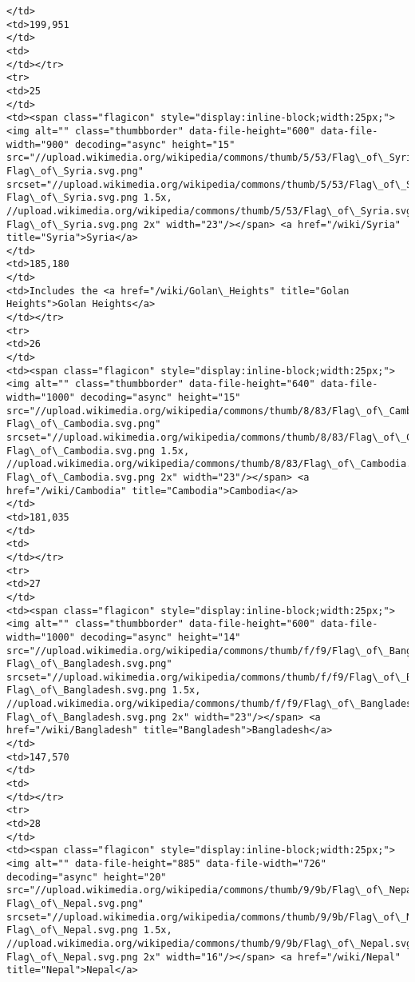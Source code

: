 \documentclass[11pt]{article}
\begin{document}
\begin{Verbatim}[commandchars=\\\{\}]
</td>
<td>199,951
</td>
<td>
</td></tr>
<tr>
<td>25
</td>
<td><span class="flagicon" style="display:inline-block;width:25px;"><img alt="" class="thumbborder" data-file-height="600" data-file-width="900" decoding="async" height="15" src="//upload.wikimedia.org/wikipedia/commons/thumb/5/53/Flag\_of\_Syria.svg/23px-Flag\_of\_Syria.svg.png" srcset="//upload.wikimedia.org/wikipedia/commons/thumb/5/53/Flag\_of\_Syria.svg/35px-Flag\_of\_Syria.svg.png 1.5x, //upload.wikimedia.org/wikipedia/commons/thumb/5/53/Flag\_of\_Syria.svg/45px-Flag\_of\_Syria.svg.png 2x" width="23"/></span> <a href="/wiki/Syria" title="Syria">Syria</a>
</td>
<td>185,180
</td>
<td>Includes the <a href="/wiki/Golan\_Heights" title="Golan Heights">Golan Heights</a>
</td></tr>
<tr>
<td>26
</td>
<td><span class="flagicon" style="display:inline-block;width:25px;"><img alt="" class="thumbborder" data-file-height="640" data-file-width="1000" decoding="async" height="15" src="//upload.wikimedia.org/wikipedia/commons/thumb/8/83/Flag\_of\_Cambodia.svg/23px-Flag\_of\_Cambodia.svg.png" srcset="//upload.wikimedia.org/wikipedia/commons/thumb/8/83/Flag\_of\_Cambodia.svg/35px-Flag\_of\_Cambodia.svg.png 1.5x, //upload.wikimedia.org/wikipedia/commons/thumb/8/83/Flag\_of\_Cambodia.svg/46px-Flag\_of\_Cambodia.svg.png 2x" width="23"/></span> <a href="/wiki/Cambodia" title="Cambodia">Cambodia</a>
</td>
<td>181,035
</td>
<td>
</td></tr>
<tr>
<td>27
</td>
<td><span class="flagicon" style="display:inline-block;width:25px;"><img alt="" class="thumbborder" data-file-height="600" data-file-width="1000" decoding="async" height="14" src="//upload.wikimedia.org/wikipedia/commons/thumb/f/f9/Flag\_of\_Bangladesh.svg/23px-Flag\_of\_Bangladesh.svg.png" srcset="//upload.wikimedia.org/wikipedia/commons/thumb/f/f9/Flag\_of\_Bangladesh.svg/35px-Flag\_of\_Bangladesh.svg.png 1.5x, //upload.wikimedia.org/wikipedia/commons/thumb/f/f9/Flag\_of\_Bangladesh.svg/46px-Flag\_of\_Bangladesh.svg.png 2x" width="23"/></span> <a href="/wiki/Bangladesh" title="Bangladesh">Bangladesh</a>
</td>
<td>147,570
</td>
<td>
</td></tr>
<tr>
<td>28
</td>
<td><span class="flagicon" style="display:inline-block;width:25px;"><img alt="" data-file-height="885" data-file-width="726" decoding="async" height="20" src="//upload.wikimedia.org/wikipedia/commons/thumb/9/9b/Flag\_of\_Nepal.svg/16px-Flag\_of\_Nepal.svg.png" srcset="//upload.wikimedia.org/wikipedia/commons/thumb/9/9b/Flag\_of\_Nepal.svg/25px-Flag\_of\_Nepal.svg.png 1.5x, //upload.wikimedia.org/wikipedia/commons/thumb/9/9b/Flag\_of\_Nepal.svg/33px-Flag\_of\_Nepal.svg.png 2x" width="16"/></span> <a href="/wiki/Nepal" title="Nepal">Nepal</a>

\end{Verbatim}
\end{document}
